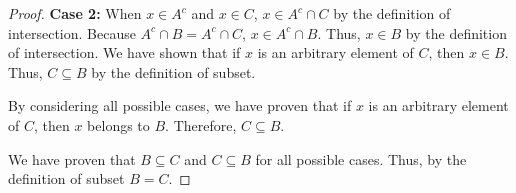 \documentclass[11 pt]{article}
\newcommand{\newpar}{\vspace{.15in}\noindent}
\begin{document}
\begin{proof}
\newpar 
\textbf{Case 2:} When $x\in A^c$ and $x\in C$, $x\in A^c\cap C$ by the definition of intersection. Because $A^c\cap B=A^c\cap C$, $x\in A^c\cap B$. Thus, $x\in B$ by the definition of intersection. We have shown that if $x$ is an arbitrary element of $C$, then $x\in B$. Thus, $C\subseteq B$ by the definition of subset.

\newpar By considering all possible cases, we have proven that if $x$ is an arbitrary element of $C$, then $x$ belongs to $B$. Therefore, $C\subseteq B$.

\newpar 
We have proven that $B\subseteq C$ and $C\subseteq B$ for all possible cases. Thus, by the definition of subset $B=C$.


\end{proof}
\end{document}
